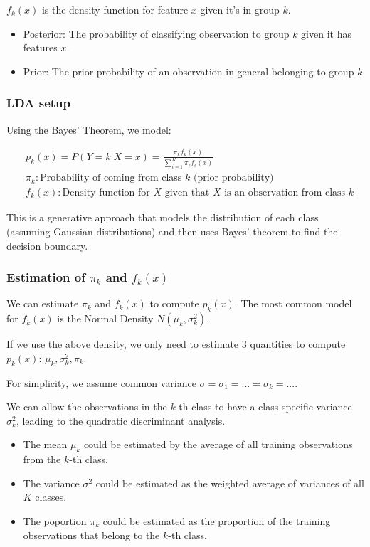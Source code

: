 $f_k(x)$ is the density function for feature $x$ given it’s in group $k$.

\begin{itemize}
    \item Posterior: The probability of classifying observation to group $k$ given it has features $x$.
    \item Prior: The prior probability of an observation in general belonging to group $k$
\end{itemize}

\subsubsection{LDA setup}

\indent 

Using the Bayes’ Theorem, we model:

\begin{align*}
    & p_k(x) = P(Y=k|X=x) = \frac{\pi_kf_k(x)}{\sum_{i=1}^K\pi_\ell f_\ell (x)}\\
    & \pi_k: \text{Probability of coming from class $k$ (prior probability)}\\
    & f_k(x): \text{Density function for $X$ given that $X$ is an observation from class $k$}
\end{align*}

This is a generative approach that models the distribution of each class (assuming Gaussian distributions) and then uses Bayes’ theorem to find the decision boundary.

\subsubsection{Estimation of $\pi_k$ and $f_k(x)$}

\indent 

We can estimate $\pi_k$ and $f_k(x)$ to compute $p_k(x)$. The most common model for $f_k(x)$ is the Normal Density $N(\mu_k,\sigma_k^2)$.

If we use the above density, we only need to estimate $3$ quantities to compute $p_k(x)$: $\mu_k, \sigma_k^2, \pi_k$.

For simplicity, we assume common variance $\sigma = \sigma_1 = ...=\sigma_k = ...$.

We can allow the observations in the $k$-th class to have a class-specific variance $\sigma_k^2$, leading to the quadratic discriminant analysis.

\begin{itemize}
    \item The mean $\mu_k$ could be estimated by the average of all training observations from the $k$-th class.
    \item The variance $\sigma^2$ could be estimated as the weighted average of variances of all $K$ classes.
    \item The poportion $\pi_k$ could be estimated as the proportion of the training observations that belong to the $k$-th class.
\end{itemize}

